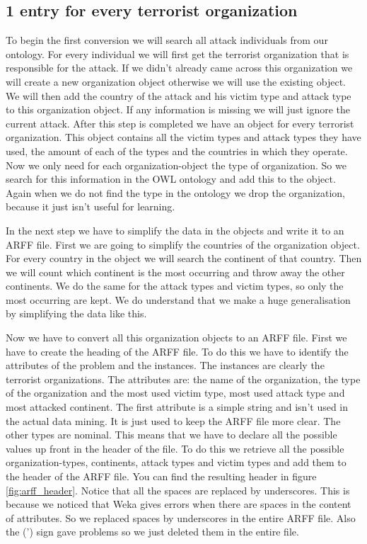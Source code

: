 \documentclass[a4]{article}
\begin{document}
\subsection{1 entry for every terrorist organization}
\label{sec:1_for_organization}
To begin the first conversion we will search all attack individuals from our ontology. For every individual we will first get the terrorist organization that is responsible for the attack. If we didn't already came across this organization we will create a new organization object otherwise we will use the existing object. We will then add the country of the attack and his victim type and attack type to this organization object. If any information is missing we will just ignore the current attack. After this step is completed we have an object for every terrorist organization. This object contains all the victim types and attack types they have used, the amount of each of the types and the countries in which they operate. Now we only need for each organization-object the type of organization. So we search for this information in the OWL ontology and add this to the object. Again when we do not find the type in the ontology we drop the organization, because it just isn't useful for learning.\par
In the next step we have to simplify the data in the objects and write it to an ARFF file. First we are going to simplify the countries of the organization object. For every country in the object we will search the continent of that country. Then we will count which continent is the most occurring and throw away the other continents. We do the same for the attack types and victim types, so only the most occurring are kept. We do understand that we make a huge generalisation by simplifying the data like this.\par
Now we have to convert all this organization objects to an ARFF file. First we have to create the heading of the ARFF file. To do this we have to identify the attributes of the problem and the instances. The instances are clearly the terrorist organizations. The attributes are: the name of the organization, the type of the organization and the most used victim type, most used attack type and most attacked continent. The first attribute is a simple string and isn't used in the actual data mining. It is just used to keep the ARFF file more clear. The other types are nominal. This means that we have to declare all the possible values up front in the header of the file. To do this we retrieve all the possible organization-types, continents, attack types and victim types and add them to the header of the ARFF file. You can find the resulting header in figure \ref{fig:arff_header}. Notice that all the spaces are replaced by underscores. This is because we noticed that Weka gives errors when there are spaces in the content of attributes. So we replaced spaces by underscores in the entire ARFF file. Also the (') sign gave problems so we just deleted them in the entire file.\par
\end{document}

